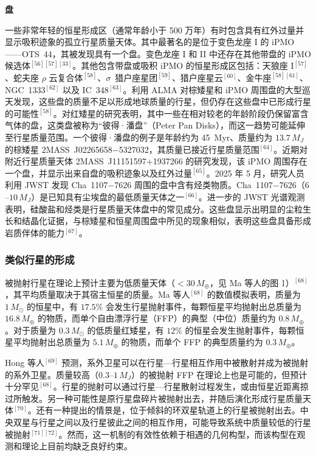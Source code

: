 \textbf{盘}

一些非常年轻的恒星形成区（通常年龄小于 500 万年）有时包含具有红外过量并显示吸积迹象的孤立行星质量天体。其中最著名的是位于变色龙座 I 的 iPMO——OTS~44，其被发现具有一个盘。变色龙座 I 和 II 中还存在其他带盘的 iPMO 候选体$^{[56][57][33]}$。其他包含带盘或吸积 iPMO 的恒星形成区包括：天狼座 I$^{[57]}$、蛇夫座 $\rho$ 云复合体$^{[58]}$、$\sigma$~猎户座星团$^{[59]}$、猎户座星云$^{[60]}$、金牛座$^{[58][61]}$、NGC~1333$^{[62]}$ 以及 IC~348$^{[63]}$。利用 ALMA 对棕矮星和 iPMO 周围盘的大型巡天发现，这些盘的质量不足以形成地球质量的行星，但仍存在这些盘中已形成行星的可能性$^{[58]}$。对红矮星的研究表明，其中一些在相对较老的年龄阶段仍保留富含气体的盘，这类盘被称为“彼得·潘盘”（Peter Pan Disks），而这一趋势可能延伸至行星质量范围。一个彼得·潘盘的例子是年龄约为 45~Myr、质量约为 $13.7\,M_J$ 的棕矮星 2MASS~J02265658$-$5327032，其质量已接近行星质量范围$^{[64]}$。近期对附近行星质量天体 2MASS~J11151597+1937266 的研究发现，该 iPMO 周围存在一个盘，并显示出来自盘的吸积迹象以及红外过量$^{[65]}$。2025 年 5 月，研究人员利用 JWST 发现 Cha~1107$-$7626 周围的盘中含有烃类物质。Cha~1107$-$7626（$6$--$10\,M_J$）是已知具有尘埃盘的最低质量天体之一$^{[66]}$。进一步的 JWST 光谱观测表明，硅酸盐和烃类是行星质量天体盘中的常见成分。这些盘显示出明显的尘粒生长和结晶化证据，与棕矮星和恒星周围盘中所见的现象相似，表明这些盘具备形成岩质伴体的能力$^{[67]}$。
\subsubsection{类似行星的形成}
被抛射行星在理论上预计主要为低质量天体（$<30\,M_\oplus$，见 Ma 等人的图 1）$^{[68]}$，其平均质量取决于其宿主恒星的质量。Ma 等人$^{[68]}$ 的数值模拟表明，质量为 $1\,M_\odot$ 的恒星中，有 $17.5\%$ 会发生行星抛射事件，每颗恒星平均抛射出总质量为 $16.8\,M_\oplus$ 的物质，而单个自由漂浮行星（FFP）的典型（中位）质量约为 $0.8\,M_\oplus$。对于质量为 $0.3\,M_\odot$ 的低质量红矮星，有 $12\%$ 的恒星会发生抛射事件，每颗恒星平均抛射出总质量为 $5.1\,M_\oplus$ 的物质，而单个 FFP 的典型质量约为 $0.3\,M_\oplus$。

Hong 等人$^{[69]}$ 预测，系外卫星可以在行星—行星相互作用中被散射并成为被抛射的系外卫星。质量较高（$0.3$--$1\,M_J$）的被抛射 FFP 在理论上也是可能的，但预计十分罕见$^{[68]}$。行星的抛射可以通过行星—行星散射过程发生，或由恒星近距离掠过所触发。另一种可能性是原行星盘碎片被抛射出去，并随后演化形成行星质量天体$^{[70]}$。还有一种提出的情景是，位于倾斜的环双星轨道上的行星被抛射出去。中央双星与行星之间以及行星彼此之间的相互作用，可能导致系统中质量较低的行星被抛射$^{[71][72]}$。然而，这一机制的有效性依赖于相遇的几何构型，而该构型在观测和理论上目前均缺乏良好约束。

